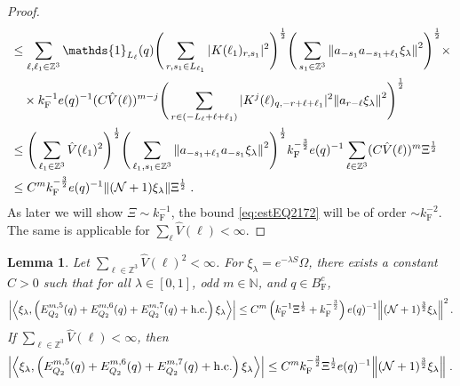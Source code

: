 \documentclass[12pt,a4paper]{article}
\numberwithin{equation}{section}
\newcommand{\NNN}{\mathbb{N}}
\newcommand{\1}{\mathbb{I}}
\newcommand{\F}{\mathrm{F}}
\newcommand{\kF}{k_\F}
\newcommand{\Zstar}{\mathbb{Z}^3} %
\newcommand{\Z}{\mathbb{Z}}
\newcommand{\NN}{\mathcal{N}}
\newcommand{\half}{\frac{1}{2}}
\newcommand{\eva}[1]{\left\langle #1 \right\rangle}
\theoremstyle{plain}
\newtheorem{lemma}[theorem]{Lemma}
\theoremstyle{definition}
\theoremstyle{remark}
\theoremstyle{plain}
\theoremstyle{definition}
\theoremstyle{remark}
\begin{document}
\begin{proof}
\begin{align}
	&\leq \sum_{\ell,\ell_1 \in \Zstar} \mathds{1}_{L_\ell}(q) \Bigg( \sum\limits_{r,s_1\in L_{\ell_1}} 
		|K(\ell_1)_{r,s_1}|^2 \Bigg)^{\half}
		\Bigg( \sum\limits_{s_1 \in \Z^3}
		\norm{a_{-s_1} a_{-s_1+\ell_1} \xi_\lambda}^2 \Bigg)^{\half} \times \nonumber\\
		&\quad \times \kF^{-1} e(q)^{-1} (C \hat{V}(\ell))^{m-j}
		\Bigg( \sum\limits_{r\in (-L_{\ell}+\ell+\ell_1)} 
		|K^j(\ell)_{q,-r+\ell+\ell_1}|^2
		\norm{ a_{r-\ell} \xi_\lambda }^2 \Bigg)^{\half} \nonumber\\
	&\leq  \Bigg( \sum_{\ell_1 \in \Zstar} 
		\hat{V}(\ell_1)^2 \Bigg)^{\half}
		\Bigg( \sum\limits_{\ell_1,s_1 \in \Z^3}
		\norm{a_{-s_1+\ell_1} a_{-s_1} \xi_\lambda}^2 \Bigg)^{\half}
		\kF^{-\frac 32} e(q)^{-1} \sum_{\ell \in \Zstar} (C \hat{V}(\ell))^m \Xi^\half \nonumber\\
	&\leq C^m \kF^{-\frac 32} e(q)^{-1}
		\norm{(\NN+1) \xi_\lambda} \Xi^{\half} \;. \label{eq:estEQ2172}
\end{align}
As later we will show $ \Xi \sim \kF^{-1} $, the bound \eqref{eq:estEQ2172} will be of order $ \sim \kF^{-2} $. The same is applicable for $ \sum_\ell \hat{V}(\ell) < \infty $.
\end{proof}


\begin{lemma} \label{lem:EQ213}
Let $ \sum_{\ell \in \Zstar} \hat{V}(\ell)^2 < \infty $. For $\xi_\lambda = e^{-\lambda S} \Omega$, there exists a constant $ C > 0 $ such that for all $ \lambda \in [0,1] $, odd $ m \in \NNN $, and $ q \in B_{\F}^c $,
\begin{equation}
\begin{aligned}
	\abs{\eva{\xi_\lambda,\left(E^{m,5}_{Q_2}(q) + E^{m,6}_{Q_2}(q) + E^{m,7}_{Q_2}(q) + \mathrm{h.c.}\right) \xi_\lambda }}
	\leq C^m \left( \kF^{-1} \Xi^{\half}
		+ \kF^{-\frac 32} \right)
		e(q)^{-1}
		\norm { (\NN+1)^{\frac 32} \xi_\lambda }^2 \,. \label{eq:estEQ213_Coulomb}
\end{aligned}
\end{equation}
If $ \sum_{\ell \in \Zstar} \hat{V}(\ell) < \infty $, then
\begin{equation}
\begin{aligned}
	\abs{\eva{\xi_\lambda,\left(E^{m,5}_{Q_2}(q) + E^{m,6}_{Q_2} (q) + E^{m,7}_{Q_2}(q) + \mathrm{h.c.}\right) \xi_\lambda }}
	\leq C^m \kF^{-\frac 32} \Xi^{\half} e(q)^{-1}
		\norm { (\NN+1)^{\frac 32} \xi_\lambda } \;. \label{eq:estEQ213}
\end{aligned}
\end{equation}
\end{lemma}
\end{document}
